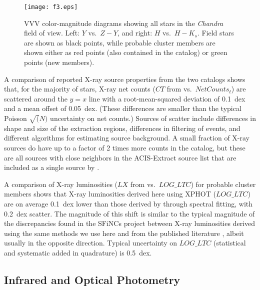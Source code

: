 \documentclass[twocolumn,tighten]{aastex61}
\begin{document}
\begin{figure*}
\centering
\texttt{[image: f3.eps]} 
\caption{VVV color-magnitude diagrams showing all stars in the {\it Chandra} field of view. Left: $Y$ vs.\ $Z-Y$, and right: $H$ vs.\ $H-K_s$. Field stars are shown as black points, while probable cluster members are shown either as red points (also contained in the  catalog) or green points (new members).
\label{new_sources.fig}}
\end{figure*}

A comparison of reported X-ray source properties from the two catalogs shows that, for the majority of stars, X-ray net counts ($CT$ from  vs.\ $NetCounts_t$) are scattered around the $y=x$ line with a root-mean-squared deviation of 0.1~dex and a mean offset of 0.05~dex. (These differences are smaller than the typical Poisson $\sqrt(N)$ uncertainty on net counts.) Sources of scatter include differences in shape and size of the extraction regions, differences in filtering of events, and different algorithms for estimating source background. A small fraction of X-ray sources do have up to a factor of 2 times more counts in the  catalog, but these are all sources with close neighbors in the ACIS-Extract source list that are included as a single source by .  

A comparison of X-ray luminosities ($LX$ from  vs.\ $LOG\_LTC$) for probable cluster members shows that X-ray luminosities derived here using XPHOT ($LOG\_LTC$) are on average 0.1~dex lower than those derived by  through spectral fitting, with 0.2~dex scatter. The magnitude of this shift is similar to the typical magnitude of the discrepancies found in the SFiNCs project between X-ray luminosities derived using the same methods we use here and from the published literature \citep[][their Figure~A2]{2017ApJS..229...28G}, albeit usually in the opposite direction. Typical uncertainty on $LOG\_LTC$ (statistical and systematic added in quadrature) is 0.5~dex. 




\subsection{Infrared and Optical Photometry \label{nir.sec}}
\end{document}
